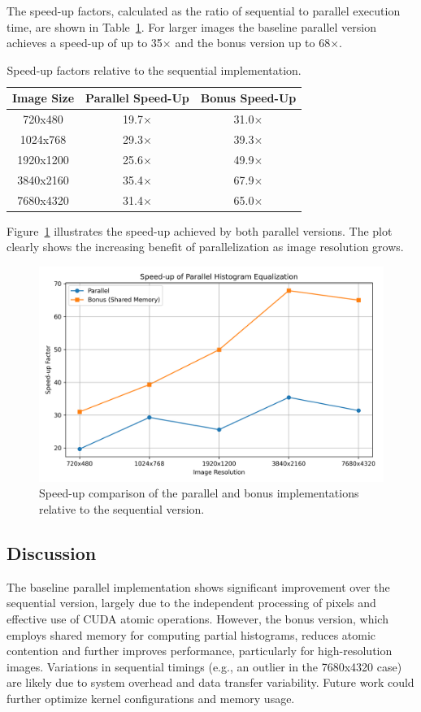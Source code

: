 \documentclass[9pt]{IEEEtran}
\begin{document}
The speed-up factors, calculated as the ratio of sequential to parallel execution time, are shown in Table~\ref{tab:speedups}. For larger images the baseline parallel version achieves a speed-up of up to 35\(\times\) and the bonus version up to 68\(\times\).

\begin{table}[H]
\centering
\begin{tabular}{|c|c|c|}
\hline
Image Size & Parallel Speed-Up & Bonus Speed-Up \\ \hline
720x480   & 19.7\(\times\)   & 31.0\(\times\) \\ \hline
1024x768  & 29.3\(\times\)   & 39.3\(\times\) \\ \hline
1920x1200 & 25.6\(\times\)   & 49.9\(\times\) \\ \hline
3840x2160 & 35.4\(\times\)   & 67.9\(\times\) \\ \hline
7680x4320 & 31.4\(\times\)   & 65.0\(\times\) \\ \hline
\end{tabular}
\caption{Speed-up factors relative to the sequential implementation.}
\label{tab:speedups}
\end{table}

Figure~\ref{fig:speedup} illustrates the speed-up achieved by both parallel versions. The plot clearly shows the increasing benefit of parallelization as image resolution grows.

\begin{figure}[H]
    \centering
    \includegraphics[width=0.9\columnwidth]{speedup.png}
    \caption{Speed-up comparison of the parallel and bonus implementations relative to the sequential version.}
    \label{fig:speedup}
\end{figure}

\subsection*{Discussion}
The baseline parallel implementation shows significant improvement over the sequential version, largely due to the independent processing of pixels and effective use of CUDA atomic operations. However, the bonus version, which employs shared memory for computing partial histograms, reduces atomic contention and further improves performance, particularly for high-resolution images. Variations in sequential timings (e.g., an outlier in the 7680x4320 case) are likely due to system overhead and data transfer variability. Future work could further optimize kernel configurations and memory usage.
\end{document}
